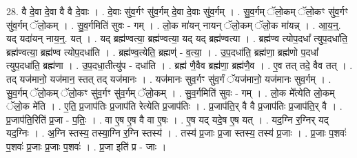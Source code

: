 \documentclass[17pt]{extarticle}
\begin{document}
28. वै दे॒वा दे॒वा वै वै दे॒वाः । . दे॒वाः सु॑व॒र्गꣳ सु॑व॒र्गम् दे॒वा दे॒वाः सु॑व॒र्गम् । . सु॒व॒र्गम् ॅलो॒कम् ॅलो॒कꣳ सु॑व॒र्गꣳ सु॑व॒र्गम् ॅलो॒कम् । . सु॒व॒र्गमिति॑ सुवः - गम् । . लो॒क मा॑यन् नायन् ॅलो॒कम् ॅलो॒क मा॑यन्न् । . आ॒य॒न्॒. यद् यदा॑यन् नाय॒न्॒. यत् । . यद् ब्रह्म॑ण्वत्या॒ ब्रह्म॑ण्वत्या॒ यद् यद् ब्रह्म॑ण्वत्या । . ब्रह्म॑ण्व त्योप॒दधा᳚ त्युप॒दधा॑ति॒ ब्रह्म॑ण्वत्या॒ ब्रह्म॑ण्व त्योप॒दधा॑ति । . ब्रह्म॑ण्व॒त्येति॒ ब्रह्मण्॑ - व॒त्या॒ । . उ॒प॒दधा॑ति॒ ब्रह्म॑णा॒ ब्रह्म॑णो प॒दधा᳚ त्युप॒दधा॑ति॒ ब्रह्म॑णा । . उ॒प॒दधा॒तीत्यु॑प - दधा॑ति । . ब्रह्म॑ णै॒वैव ब्रह्म॑णा॒ ब्रह्म॑णै॒व । . ए॒व तत् तदे॒ वैव तत् । . तद् यज॑मानो॒ यज॑मान॒ स्तत् तद् यज॑मानः । . यज॑मानः सुव॒र्गꣳ सु॑व॒र्गं ॅयज॑मानो॒ यज॑मानः सुव॒र्गम् । . सु॒व॒र्गम् ॅलो॒कम् ॅलो॒कꣳ सु॑व॒र्गꣳ सु॑व॒र्गम् ॅलो॒कम् । . सु॒व॒र्गमिति॑ सुवः - गम् । . लो॒क मे᳚त्येति लो॒कम् ॅलो॒क मे॑ति । . ए॒ति॒ प्र॒जाप॑तिः प्र॒जाप॑ति रेत्येति प्र॒जाप॑तिः । . प्र॒जाप॑ति॒र् वै वै प्र॒जाप॑तिः प्र॒जाप॑ति॒र् वै । . प्र॒जाप॑ति॒रिति॑ प्र॒जा - प॒तिः॒ । . वा ए॒ष ए॒ष वै वा ए॒षः । . ए॒ष यद् यदे॒ष ए॒ष यत् । . यद॒ग्नि र॒ग्निर् यद् यद॒ग्निः । . अ॒ग्नि स्तस्य॒ तस्या॒ग्नि र॒ग्नि स्तस्य॑ । . तस्य॑ प्र॒जाः प्र॒जा स्तस्य॒ तस्य॑ प्र॒जाः । . प्र॒जाः प॒शवः॑ प॒शवः॑ प्र॒जाः प्र॒जाः प॒शवः॑ । . प्र॒जा इति॑ प्र - जाः । \newline
\end{document}
